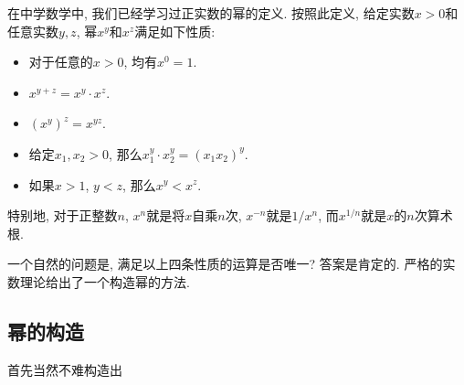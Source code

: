 

在中学数学中, 我们已经学习过正实数的幂的定义. 按照此定义, 给定实数$x>0$和任意实数$y,z$, 幂$x^y$和$x^z$满足如下性质:

\begin{itemize}
\item 对于任意的$x>0$, 均有$x^0=1$.
\item $x^{y+z}=x^y\cdot x^z$.
\item $(x^y)^z=x^{yz}$.
\item 给定$x_1,x_2>0$, 那么$x_1^y\cdot x_2^y=(x_1x_2)^y$.
\item 如果$x>1$, $y<z$, 那么$x^y<x^z$.
\end{itemize}

特别地, 对于正整数$n$, $x^n$就是将$x$自乘$n$次, $x^{-n}$就是$1/x^n$, 而$x^{1/n}$就是$x$的$n$次算术根. 

一个自然的问题是, 满足以上四条性质的运算是否唯一? 答案是肯定的. 严格的实数理论给出了一个构造幂的方法.

\subsection{幂的构造}

首先当然不难构造出